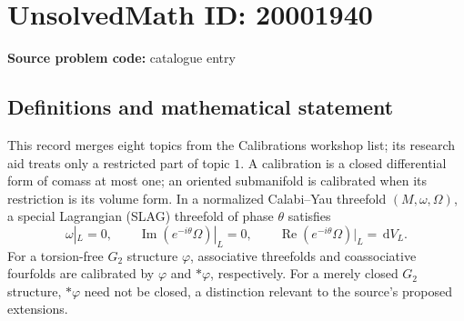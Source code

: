 \documentclass[11pt]{article}
\newcommand{\dd}{\,\mathrm{d}}
\begin{document}
\section*{UnsolvedMath ID: 20001940}
\textbf{Source problem code:} catalogue entry
\subsection{Definitions and mathematical statement}
This record merges eight topics from the Calibrations workshop list; its research aid treats only a restricted part of topic \(1\). A calibration is a closed differential form of comass at most one; an oriented submanifold is calibrated when its restriction is its volume form. In a normalized Calabi--Yau threefold \((M,\omega,\Omega)\), a special Lagrangian (SLAG) threefold of phase \(\theta\) satisfies
\[
 \omega|_L=0,\qquad\operatorname{Im}(e^{-i\theta}\Omega)|_L=0,\qquad
 \operatorname{Re}(e^{-i\theta}\Omega)|_L=\dd V_L.
\]
For a torsion-free \(G_2\) structure \(\varphi\), associative threefolds and coassociative fourfolds are calibrated by \(\varphi\) and \(*\varphi\), respectively. For a merely closed \(G_2\) structure, \(*\varphi\) need not be closed, a distinction relevant to the source's proposed extensions.
\end{document}
